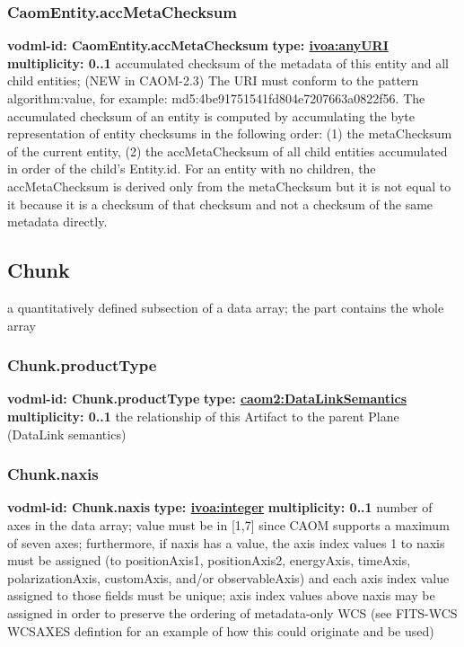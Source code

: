     \subsubsection{CaomEntity.accMetaChecksum}
      \textbf{vodml-id: CaomEntity.accMetaChecksum} \newline
      \textbf{type: \hyperref[sect:ivoa]{ivoa:anyURI}} \newline
      \textbf{multiplicity: 0..1} \newline
      accumulated checksum of the metadata of this entity and all child entities; (NEW in CAOM-2.3) The URI must conform to the pattern {algorithm}:{value}, for example: md5:4be91751541fd804e7207663a0822f56. The accumulated checksum of an entity is computed by accumulating the byte representation of entity checksums in the following order: (1) the metaChecksum of the current entity, (2) the accMetaChecksum of all child entities accumulated in order of the child's Entity.id. For an entity with no children, the accMetaChecksum is derived only from the metaChecksum but it is not equal to it because it is a checksum of that checksum and not a checksum of the same metadata directly.

  \subsection{Chunk}
  \label{sect:Chunk}
    a quantitatively defined subsection of a data array; the part contains the whole array

    \subsubsection{Chunk.productType}
      \textbf{vodml-id: Chunk.productType} \newline
      \textbf{type: \hyperref[sect:DataLinkSemantics]{caom2:DataLinkSemantics}} \newline
      \textbf{multiplicity: 0..1} \newline
      the relationship of this Artifact to the parent Plane (DataLink semantics)

    \subsubsection{Chunk.naxis}
      \textbf{vodml-id: Chunk.naxis} \newline
      \textbf{type: \hyperref[sect:ivoa]{ivoa:integer}} \newline
      \textbf{multiplicity: 0..1} \newline
      number of axes in the data array; value must be in [1,7] since CAOM supports a maximum of seven axes; furthermore, if naxis has a value, the axis index values 1 to {naxis} must be assigned (to positionAxis1, positionAxis2, energyAxis, timeAxis, polarizationAxis, customAxis, and/or observableAxis) and each axis index value assigned to those fields must be unique; axis index values above {naxis} may be assigned in order to preserve the ordering of metadata-only WCS (see FITS-WCS WCSAXES defintion for an example of how this could originate and be used)

